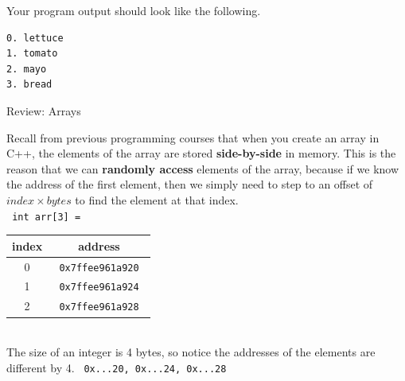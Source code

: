\documentclass[a4paper,12pt]{book}
\begin{document}
                    Your program output should look like the following.
\begin{lstlisting}[style=output]
0. lettuce
1. tomato
2. mayo
3. bread
\end{lstlisting}


            \newpage
            \begin{intro}{ Review: Arrays }

            Recall from previous programming courses that
            when you create an array in C++, the elements
            of the array are stored \textbf{ side-by-side }
            in memory. This is the reason that we can
            \textbf{ randomly access } elements of the array,
            because if we know the address of the first element,
            then we simply need to step to an offset of
            $ index \times bytes $ to find the element at that index. \\

            \texttt{ int arr[3] = } ~\\

            \begin{center}
                \begin{tabular}{ | c | c | }
                    \hline
                    \textbf{ index } & \textbf{ address } \\ \hline

                    0 & \texttt{ 0x7ffee961a920 }
                    \\ \hline

                    1 & \texttt{ 0x7ffee961a924 }
                    \\ \hline

                    2 & \texttt{ 0x7ffee961a928 }
                    \\ \hline
                    
                \end{tabular}
            \end{center}
            
            ~\\ The size of an integer is 4 bytes, so notice the addresses of the elements are different by 4.
            \texttt{ 0x...20, \tab 0x...24, \tab 0x...28 }
            
            \end{intro}

            \hrulefill{}
            \newpage
\end{document}
